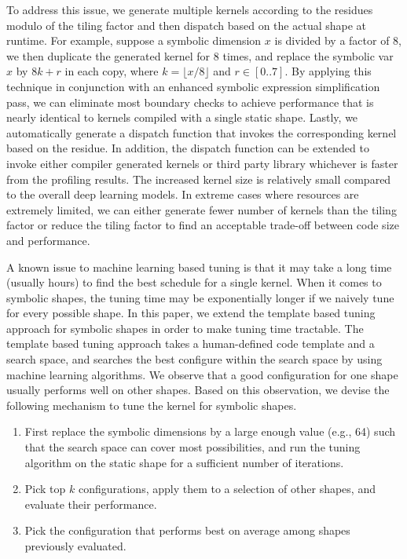 To address this issue, we generate multiple kernels according to the residues modulo of the tiling factor and then dispatch based on the actual shape at runtime.
For example, suppose a symbolic dimension $x$ is divided by a factor of 8, we then duplicate the generated kernel for 8 times, and replace the symbolic var $x$ by $8k+r$ in each copy, where $k = \lfloor x / 8 \rfloor$ and $r \in [0..7]$. By applying this technique in conjunction with an enhanced symbolic expression simplification pass, we can eliminate most boundary checks to achieve performance that is nearly identical to kernels compiled with a single static shape. Lastly, we automatically generate a dispatch function that invokes the corresponding kernel based on the residue.
In addition, the dispatch function can be extended to invoke either compiler generated kernels or third party library whichever is faster from the profiling results.
The increased kernel size is relatively small compared to the overall deep learning models.
In extreme cases where resources are extremely limited, we can either generate fewer number of kernels than the tiling factor or reduce the tiling factor to find an acceptable trade-off between code size and performance.

A known issue to machine learning based tuning is that it may take a long time (usually hours) to find the best schedule for a single kernel. When it comes to symbolic shapes, the tuning time may be exponentially longer if we naively tune for every possible shape. In this paper, we extend the template based tuning approach for symbolic shapes in order to make tuning time tractable. The template based tuning approach takes a human-defined code template and a search space, and searches the best configure within the search space by using machine learning algorithms.
We observe that a good configuration for one shape usually performs well on other shapes. Based on this observation, we devise the following mechanism to tune the kernel for symbolic shapes.

\begin{enumerate}[leftmargin=*]
    \itemsep 0em
    \item First replace the symbolic dimensions by a large enough value (e.g., 64) such that the search space can cover most possibilities, and run the tuning algorithm on the static shape for a sufficient number of iterations.
    \item Pick top $k$ configurations, apply them to a selection of other shapes, and evaluate their performance.
    \item Pick the configuration that performs best on average among shapes previously evaluated.
\end{enumerate}

